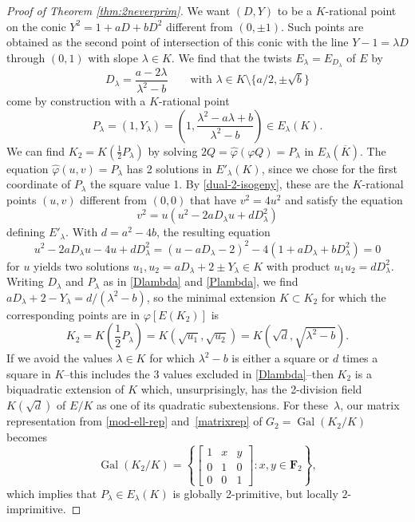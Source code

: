 \documentclass{amsart}
\theoremstyle{plain}
\theoremstyle{definition}
\DeclareMathOperator{\Gal}{Gal}
\newcommand{\FF}{{\mathbf{F}}}
\begin{document}
\begin{proof}[Proof of Theorem \ref{thm:2neverprim}]
We want $(D,Y)$ to be a $K$-rational point on
the conic $Y^2=1+aD+bD^2$ different from $(0,\pm 1)$.
Such points are obtained as the second point of intersection 
of this conic with the line $Y-1=\lambda D$ through $(0,1)$ with slope $\lambda \in K$.
We find that the twists $E_\lambda=E_{D_\lambda}$ of $E$ by 
\begin{equation}
\label{Dlambda}
D_\lambda=\frac{a-2\lambda}{\lambda^2-b} \qquad     
\text{with }\lambda\in K\setminus
\{a/2,\pm\sqrt b\}
\end{equation}
come by construction with a $K$-rational point
\begin{equation}
\label{Plambda}
P_\lambda=(1,Y_\lambda)=
\left(1,\frac{\lambda^2-a\lambda+b}{\lambda^2-b}\right)
\in E_\lambda(K).
\end{equation}
We can find $K_2=K(\frac{1}{2} P_\lambda)$
by solving $2Q=\widehat\varphi(\varphi Q) = P_\lambda$ in $E_\lambda(\overline K)$.
The equation $\widehat\varphi(u,v)=P_\lambda$
has 2 solutions in $E'_\lambda(K)$, since we chose for 
the first coordinate of $P_\lambda$ the square value 1. 
By \eqref{dual-2-isogeny}, these are the $K$-rational points $(u,v)$ different from $(0,0)$ 
that have $v^2=4u^2$ and satisfy the equation 
\[
v^2= u(u^2-2aD_\lambda u+ dD_\lambda^2)
\]
defining $E'_\lambda$. 
With $d=a^2-4b$, the resulting equation
\[
u^2-2aD_\lambda u -4u + dD_\lambda^2 = (u-aD_\lambda-2)^2 - 4 (1+aD_\lambda+bD_\lambda^2)=0
\]
for $u$ yields two solutions
$
u_1, u_2 = aD_\lambda+2 \pm Y_\lambda  \in K
$
with product $u_1u_2=dD_\lambda^2$.
Writing $D_\lambda$ and $P_\lambda$ as in 
\eqref{Dlambda} and \eqref{Plambda},
we find $aD_\lambda+2 - Y_\lambda=d/(\lambda^2-b)$, so
the minimal extension $K\subset K_2$ for which the 
corresponding points are in $\varphi[E(K_2)]$ is 
\[
K_2 = K(\textstyle\frac{1}{2} P_\lambda)= K(\sqrt {u_1}, \sqrt{u_2})
     = K(\sqrt d, \sqrt{\lambda^2 - b}).
\]
If we avoid the values $\lambda\in K$
for which $\lambda^2 - b$ is either a square or $d$ times a 
square in $K$--this includes the 3 values excluded in \eqref{Dlambda}--then 
$K_2$ is a biquadratic extension of $K$ which, unsurprisingly, 
has the 2-division field $K(\sqrt d)$ of $E/K$
as one of its quadratic subextensions.
For these~$\lambda$, our matrix representation from
\eqref{mod-ell-rep} and~\eqref{matrixrep} 
of $G_2=\Gal(K_2/K)$ becomes
\[
\Gal(K_2/K)= 
\left\{ \begin{bmatrix}
1 & x & y \\
0 & 1 & 0 \\
0 & 0 & 1 
\end{bmatrix}: x,y\in\FF_2  \right\},
\]
which implies that $P_\lambda\in E_\lambda(K)$ is globally 2-primitive, but locally $2$-imprimitive. 


\end{proof}
\end{document}
